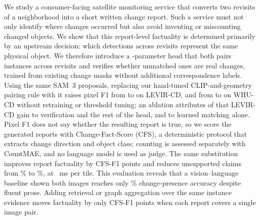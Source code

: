 We study a consumer-facing satellite monitoring service that converts two
revisits of a neighborhood into a short written change report. Such a service
must not only identify where changes occurred but also avoid inventing or
miscounting changed objects. We show that this report-level factuality is
determined primarily by an upstream decision: which detections across revisits
represent the same physical object. We therefore introduce a
\HeadParamsRound-parameter head that both pairs instances across revisits and
verifies whether unmatched ones are real changes, trained from existing change
masks without additional correspondence labels. Using the same SAM~3 proposals,
replacing our hand-tuned CLIP-and-geometry pairing rule with it raises pixel F1
from \EOneHeuristicFOne{} to \EOnePixelFOne{} on LEVIR-CD, and from
\ETwoHeuristicFOne{} to \ETwoPixelFOne{} on WHU-CD without retraining or
threshold tuning; an ablation attributes \EOneSuppressionGain{} of that
LEVIR-CD gain to verification and the rest of the head, and \EOneMatchGain{}
to learned matching alone. Pixel F1 does not say whether the resulting report is true, so
we score the generated reports with Change-Fact-Score (CFS), a deterministic
protocol that extracts change direction and object class; counting is assessed
separately with CountMAE, and no language model is used as judge. The same
substitution improves report factuality by \EFiveGain{} CFS-F1 points and
reduces unsupported claims from \EFiveHeuristicHal\% to \EFiveLearnedHal\%, at
\ESixHeadDelta~ms per tile. This evaluation reveals that a vision--language
baseline shown both images reaches only \EFourVLMChgAcc\% change-presence
accuracy despite fluent prose. Adding retrieval or graph aggregation over the
same instance evidence moves factuality by only
\EFourLadderExactSpread{} CFS-F1 points when each report covers a single image
pair.
